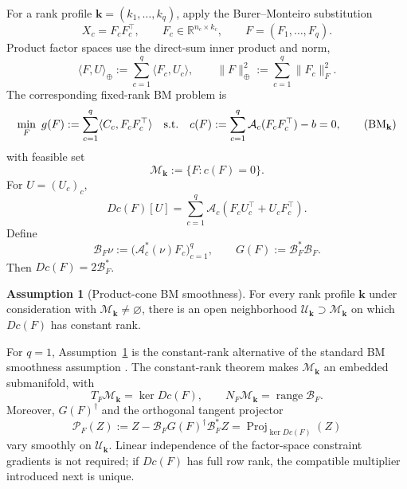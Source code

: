 \documentclass[11pt]{article}
\theoremstyle{definition}
\newtheorem{assumption}{Assumption}
\theoremstyle{remark}
\begin{document}
For a rank profile
$\mathbf k=(k_1,\ldots,k_q)$, apply the Burer--Monteiro substitution
\[
  X_c=F_cF_c^\top,
  \qquad
  F_c\in\mathbb R^{n_c\times k_c},
  \qquad
  F=(F_1,\ldots,F_q).
\]
Product factor spaces use the direct-sum inner product and norm,
\[
  \langle F,U\rangle_\oplus
  :=\sum_{c=1}^q\langle F_c,U_c\rangle,
  \qquad
  \|F\|_\oplus^2:=\sum_{c=1}^q\|F_c\|_F^2.
\]
The corresponding fixed-rank BM problem is
\begin{equation*}
  \min_F\
  g(F):=\sum_{c=1}^q\langle C_c,F_cF_c^\top\rangle
  \quad\text{s.t.}\quad
  c(F):=\sum_{c=1}^q\mathcal A_c(F_cF_c^\top)-b=0,
  \tag{$\mathrm{BM}_{\mathbf k}$}
  \label{eq:bm-fixed-rank}
\end{equation*}
with feasible set
\begin{equation}
  \mathcal M_{\mathbf k}:=\{F:c(F)=0\}.
  \label{eq:product-slack-manifold}
\end{equation}
For $U=(U_c)_c$,
\begin{equation}
  Dc(F)[U]
  =\sum_{c=1}^q
    \mathcal A_c(F_cU_c^\top+U_cF_c^\top).
  \label{eq:product-jacobian}
\end{equation}
Define
\begin{equation}
  \mathcal B_F\nu
  :=\bigl(\mathcal A_c^*(\nu)F_c\bigr)_{c=1}^q,
  \qquad
  G(F):=\mathcal B_F^*\mathcal B_F.
  \label{eq:BF-and-Gram}
\end{equation}
Then $Dc(F)=2\mathcal B_F^*$.

\begin{assumption}[Product-cone BM smoothness]
\label{ass:bm-geometry}
For every rank profile $\mathbf k$ under consideration with
$\mathcal M_{\mathbf k}\neq\varnothing$, there is an open neighborhood
$\mathcal U_{\mathbf k}\supset\mathcal M_{\mathbf k}$ on which $Dc(F)$ has
constant rank.
\end{assumption}

For $q=1$, Assumption~\ref{ass:bm-geometry} is the constant-rank alternative
of the standard BM smoothness assumption
\cite[Assumption~1.1(b)]{BVB2020}.  The constant-rank theorem makes
$\mathcal M_{\mathbf k}$ an embedded submanifold, with
\begin{equation}
  T_F\mathcal M_{\mathbf k}=\ker Dc(F),
  \qquad
  N_F\mathcal M_{\mathbf k}=\operatorname{range}\mathcal B_F.
  \label{eq:tangent-normal-spaces}
\end{equation}
Moreover, $G(F)^\dagger$ and the orthogonal tangent projector
\begin{equation}
  \mathcal P_F(Z)
  :=Z-\mathcal B_FG(F)^\dagger\mathcal B_F^*Z
  =\operatorname{Proj}_{\ker Dc(F)}(Z)
  \label{eq:tangent-projector}
\end{equation}
vary smoothly on $\mathcal U_{\mathbf k}$.  Linear independence of the
factor-space constraint gradients is not required; if $Dc(F)$ has full row
rank, the compatible multiplier introduced next is unique.
\end{document}
